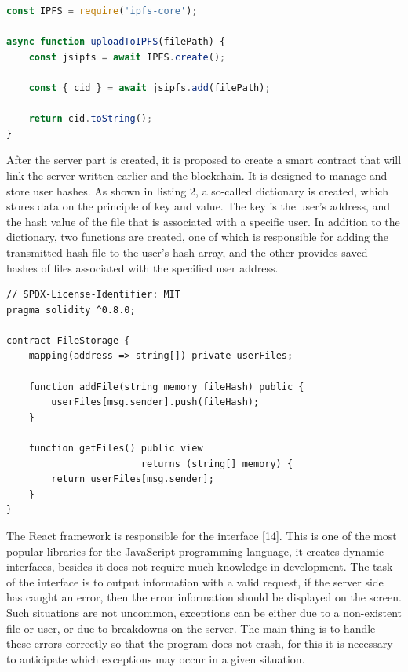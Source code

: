 \documentclass[10pt,conference,a4paper]{IEEEtran_EDM}
\begin{document}
\begin{lstlisting}[language=JavaScript, caption= Saving a file to IPFS]
const IPFS = require('ipfs-core');

async function uploadToIPFS(filePath) {
    const jsipfs = await IPFS.create();

    const { cid } = await jsipfs.add(filePath);

    return cid.toString();
}
\end{lstlisting}

After the server part is created, it is proposed to create a smart contract that will link the server written earlier and the blockchain. It is designed to manage and store user hashes. As shown in listing 2, a so-called dictionary is created, which stores data on the principle of key and value. The key is the user's address, and the hash value of the file that is associated with a specific user. In addition to the dictionary, two functions are created, one of which is responsible for adding the transmitted hash file to the user's hash array, and the other provides saved hashes of files associated with the specified user address.


\begin{lstlisting}[caption=Solidity code for a smart contract]
// SPDX-License-Identifier: MIT
pragma solidity ^0.8.0;

contract FileStorage {
    mapping(address => string[]) private userFiles;

    function addFile(string memory fileHash) public {
        userFiles[msg.sender].push(fileHash);
    }

    function getFiles() public view
                        returns (string[] memory) {
        return userFiles[msg.sender];
    }
}
\end{lstlisting}

The React framework is responsible for the interface [14]. This is one of the most popular libraries for the JavaScript programming language, it creates dynamic interfaces, besides it does not require much knowledge in development. The task of the interface is to output information with a valid request, if the server side has caught an error, then the error information should be displayed on the screen. Such situations are not uncommon, exceptions can be either due to a non-existent file or user, or due to breakdowns on the server. The main thing is to handle these errors correctly so that the program does not crash, for this it is necessary to anticipate which exceptions may occur in a given situation.
\end{document}
